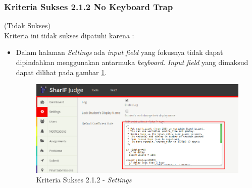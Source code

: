 \documentclass[a4paper,twoside]{article}
\begin{document}
\begin{enumerate}
\begin{itemize}
		\end{itemize}
		
		\subsubsection*{Kriteria Sukses 2.1.2 No Keyboard Trap}
		\label{subsubsec:kepatuhan_kriteria_2.1.2}
		(Tidak Sukses) \\
		
		Kriteria ini tidak sukses dipatuhi karena :
		\begin{itemize}
			\item Dalam halaman \textit{Settings} ada \textit{input field} yang fokusnya tidak dapat dipindahkan menggunakan antarmuka \textit{keyboard}. \textit{Input field} yang dimaksud dapat dilihat pada gambar \ref{fig:kepatuhan_2_1_2_settings}.
			\begin{figure}[H]
				\centering  
				\includegraphics[scale=0.5]{kepatuhan_2_1_2_settings}  
				\caption[Kriteria Sukses 2.1.2 - \textit{Settings}]{Kriteria Sukses 2.1.2 - \textit{Settings}} 
				\label{fig:kepatuhan_2_1_2_settings} 
			\end{figure}
			

\end{itemize}
\end{enumerate}
\end{document}
